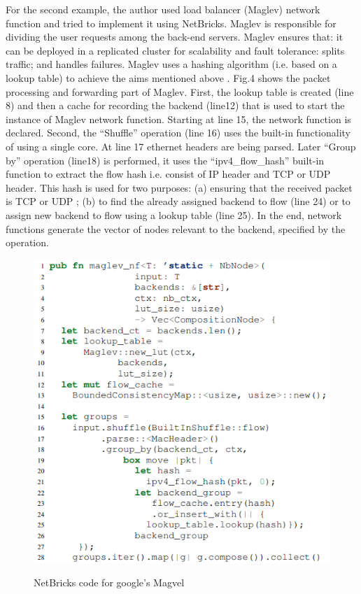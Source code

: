 \documentclass[10pt, a4paper, conference]{IEEEtran}
\begin{document}
For the second example, the author used load balancer (Maglev) network function and tried to implement it using NetBricks. Maglev is responsible for dividing the user requests among the back-end servers. Maglev ensures that: it can be deployed in a replicated cluster for scalability and fault tolerance: splits traffic; and handles failures. Maglev uses a hashing algorithm (i.e. based on a lookup table) to achieve the aims mentioned above \cite{Panda2016}. Fig.4 shows the packet processing and forwarding part of Maglev.  First, the lookup table is created (line 8) and then a cache for recording the backend (line12) that is used to start the instance of Maglev network function. Starting at line 15, the network function is declared. Second, the “Shuffle” operation (line 16) uses the built-in functionality of using a single core. At line 17 ethernet headers are being parsed. Later  “Group by” operation (line18) is performed, it uses the “ipv4\_flow\_hash” built-in function to extract the flow hash i.e. consist of IP header and TCP or UDP header. This hash is used for two purposes: (a) ensuring that the received packet is TCP or UDP ; (b) to find the already assigned backend to flow (line 24) or to assign new backend to flow using a lookup table (line 25). In the end, network functions generate the vector of nodes relevant to the backend, specified by the operation.
\begin{figure}
	\centering
	\includegraphics[width=\linewidth]{figures/fig4}
	\caption{NetBricks code for google's Magvel}
	\cite{Panda2016}
	\label{key4}
\end{figure}   
\end{document}
